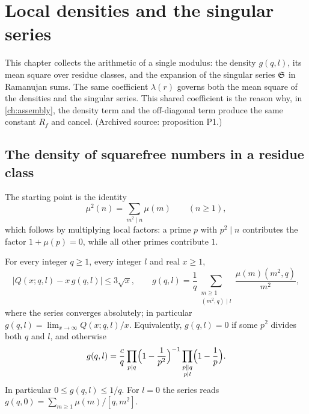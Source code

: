 \chapter{Local densities and the singular series}\label{ch:densities}

This chapter collects the arithmetic of a single modulus: the density $g(q,l)$, its mean square over residue classes, and the expansion of the singular series $\mathfrak S$ in Ramanujan sums. The same coefficient $\lambda(r)$ governs both the mean square of the densities and the singular series. This shared coefficient is the reason why, in \cref{ch:assembly}, the density term and the off-diagonal term produce the same constant $R_f$ and cancel. (Archived source: proposition P1.)

\section{The density of squarefree numbers in a residue class}

The starting point is the identity
\begin{equation}\label{eq:mu2}
\mu^2(n)=\sum_{m^2\mid n}\mu(m)\qquad(n\ge1),
\end{equation}
which follows by multiplying local factors: a prime $p$ with $p^2\mid n$ contributes the factor $1+\mu(p)=0$, while all other primes contribute $1$.

\begin{proposition}\label{prop:density}
For every integer $q\ge1$, every integer $l$ and real $x\ge1$,
\begin{equation}\label{eq:density-error}
\bigl|Q(x;q,l)-x\,g(q,l)\bigr|\le3\sqrt x,\qquad
g(q,l)=\frac1q\sum_{\substack{m\ge1\\(m^2,q)\mid l}}\frac{\mu(m)(m^2,q)}{m^2},
\end{equation}
where the series converges absolutely; in particular $g(q,l)=\lim_{x\to\infty}Q(x;q,l)/x$. Equivalently, $g(q,l)=0$ if some $p^2$ divides both $q$ and $l$, and otherwise
\begin{equation}\label{eq:density-closed}
g(q,l)=\frac cq\prod_{p\mid q}\Bigl(1-\frac1{p^2}\Bigr)^{-1}\prod_{\substack{p\parallel q\\p\mid l}}\Bigl(1-\frac1p\Bigr).
\end{equation}
In particular $0\le g(q,l)\le1/q$. For $l=0$ the series reads $g(q,0)=\sum_{m\ge1}\mu(m)/[q,m^2]$.
\end{proposition}

